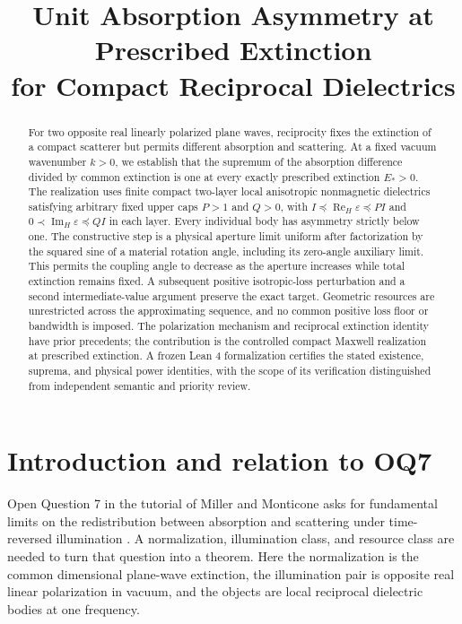 \documentclass[11pt]{article}
\title{Unit Absorption Asymmetry at Prescribed Extinction\\for Compact Reciprocal Dielectrics}
\author{}
\date{}
\newcommand{\ReH}{\operatorname{Re}_{\!H}}
\newcommand{\ImH}{\operatorname{Im}_{\!H}}
\begin{document}
\maketitle
\begin{abstract}
For two opposite real linearly polarized plane waves, reciprocity fixes the extinction of a compact scatterer but permits different absorption and scattering. At a fixed vacuum wavenumber $k>0$, we establish that the supremum of the absorption difference divided by common extinction is one at every exactly prescribed extinction $E_*>0$. The realization uses finite compact two-layer local anisotropic nonmagnetic dielectrics satisfying arbitrary fixed upper caps $P>1$ and $Q>0$, with $I\preceq\ReH\varepsilon\preceq PI$ and $0\prec\ImH\varepsilon\preceq QI$ in each layer. Every individual body has asymmetry strictly below one. The constructive step is a physical aperture limit uniform after factorization by the squared sine of a material rotation angle, including its zero-angle auxiliary limit. This permits the coupling angle to decrease as the aperture increases while total extinction remains fixed. A subsequent positive isotropic-loss perturbation and a second intermediate-value argument preserve the exact target. Geometric resources are unrestricted across the approximating sequence, and no common positive loss floor or bandwidth is imposed. The polarization mechanism and reciprocal extinction identity have prior precedents; the contribution is the controlled compact Maxwell realization at prescribed extinction. A frozen Lean 4 formalization certifies the stated existence, suprema, and physical power identities, with the scope of its verification distinguished from independent semantic and priority review.
\end{abstract}

\section{Introduction and relation to OQ7}\label{sec:intro}
Open Question 7 in the tutorial of Miller and Monticone asks for fundamental limits on the redistribution between absorption and scattering under time-reversed illumination \citep{MillerMonticone2026}. A normalization, illumination class, and resource class are needed to turn that question into a theorem. Here the normalization is the common dimensional plane-wave extinction, the illumination pair is opposite real linear polarization in vacuum, and the objects are local reciprocal dielectric bodies at one frequency.
\end{document}
